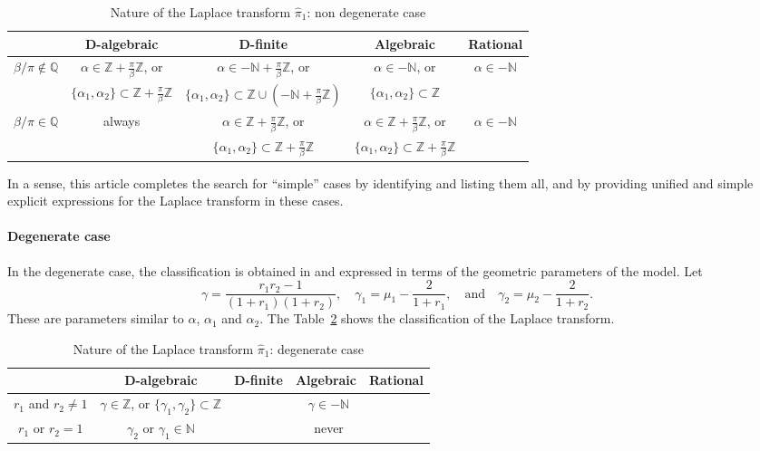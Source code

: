 \documentclass[11pt]{article}
\def\N{\mathbb{N}}
\def\Q{\mathbb{Q}}
\def\Z{\mathbb{Z}}
\theoremstyle{definition}
\begin{document}
\begin{table}[h!]
\begin{center}
\begin{tabular}{|c|c|c|c|c|}
\hline 
  & D-algebraic & D-finite & Algebraic & Rational  \\ 
\hline 
  $\beta/\pi \notin \Q$ &
 $\alpha \in \Z +\frac\pi \beta\Z$, or 
 & $\alpha \in -\N +\frac\pi \beta\Z$, or
 &  $\alpha \in -\N$, or  & $\alpha \in -\N$ 
  \\
  &{ $\{\alpha_1, \alpha_2 \} \subset \Z +\frac\pi \beta\Z$ }
 &{ $\{\alpha_1, \alpha_2 \} \subset   \Z \cup \left(-\N+ \frac \pi\beta \Z\right)$}
  &{ $\{\alpha_1, \alpha_2 \} \subset \Z $ } &\\
  \hline
  $\beta/\pi \in \Q$  & 
 always & $\alpha \in \Z +\frac\pi \beta\Z$, or 
     & $\alpha \in \Z +\frac\pi \beta\Z$, or  
    & $\alpha  \in  -\N$
  \\
  &&{ $\{\alpha_1, \alpha_2 \} \subset \Z +\frac\pi \beta\Z$ }
   &{ $\{\alpha_1, \alpha_2\}\subset \Z +\frac\pi \beta\Z$ }&\\
 \hline      
\end{tabular}
\end{center}
\caption{Nature of the Laplace transform $\widehat \pi_1$: non degenerate case}
\label{table:characterisation}
\end{table}
In a sense, this article
completes the search for “simple” cases by identifying and listing them all, and by providing unified and simple explicit expressions for the Laplace transform in these cases.


\paragraph{Degenerate case}

In the degenerate case, the classification is obtained in \cite{franceschi_degenerate_asym_2025} and expressed in terms of the geometric parameters of the model. Let
$$\gamma=\frac{r_1r_2-1}{(1+r_1)(1+r_2)},
\quad
\gamma_1 = \mu_1 - \frac{2}{1+r_1},
\quad
\text{and}
\quad
\gamma_2 = \mu_2 - \frac{2}{1+r_2}.
$$
These are parameters similar to $\alpha$, $\alpha_1$ and $\alpha_2$.
The Table~\ref{table:characterisation2} shows the classification of the Laplace transform.
\renewcommand{\arraystretch}{1.5}
\begin{table}[h!]
\begin{center}
\begin{tabular}{|c|c|c|c|c|}
\hline 
 & D-algebraic & D-finite &  Algebraic & Rational  \\ 
\hline 
  $r_1$ and   $r_2 \neq 1$ &
 $\gamma\in\Z$, or $\{\gamma_1 ,\gamma_2 \}\subset \Z$
 & \multicolumn{3}{c|}{$\gamma \in -\N$}
  \\
  \hline
    $r_1$ or $r_2=1$  & 
 $\gamma_2$ or $\gamma_1\in \mathbb{N}$ & \multicolumn{3}{c|}{never }
 \\
 \hline      
\end{tabular}
\end{center}
\caption{Nature of the Laplace transform $\widehat \pi_1$: degenerate case}
\label{table:characterisation2}
\end{table}
\end{document}

